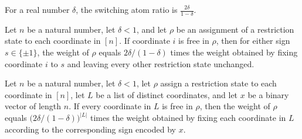 \begin{definition}
\label{FABL.switchingAtomRatio}
\leanok
For a real number $\delta$, the switching atom ratio is $\frac{2\delta}{1-\delta}$.
\end{definition}

\begin{theorem}
\label{FABL.restrictionAssignmentWeightAt_fixCoordinate}
\leanok
{}
Let $n$ be a natural number, let $\delta<1$, and let $\rho$ be an assignment of a
restriction state to each coordinate in $[n]$. If coordinate $i$ is free in $\rho$, then
for either sign $s\in\{\pm1\}$, the weight of $\rho$ equals $2\delta/(1-\delta)$ times
the weight obtained by fixing coordinate $i$ to $s$ and leaving every other restriction
state unchanged.
\end{theorem}

\begin{theorem}
\label{FABL.restrictionAssignmentWeightAt_fixCoordinateList}
\leanok
{}
Let $n$ be a natural number, let $\delta<1$, let $\rho$ assign a restriction state to
each coordinate in $[n]$, let $L$ be a list of distinct coordinates, and let $x$ be a
binary vector of length $n$. If every coordinate in $L$ is free in $\rho$, then the
weight of $\rho$ equals $\bigl(2\delta/(1-\delta)\bigr)^{|L|}$ times the weight obtained
by fixing each coordinate in $L$ according to the corresponding sign encoded by $x$.
\end{theorem}

